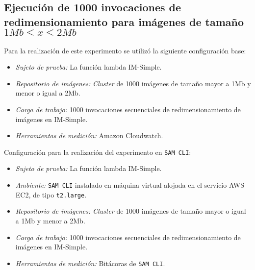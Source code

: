\subsection{Ejecución de 1000 invocaciones de redimensionamiento para imágenes de tamaño $1Mb \leq x \leq 2Mb$}

Para la realización de este experimento se utilizó la siguiente configuración base:
\begin{itemize}
    \item \emph{Sujeto de prueba:} La función lambda IM-Simple.
    \item \emph{Repositorio de imágenes:} \emph{Cluster} de 1000 imágenes de tamaño mayor a 1Mb y menor o igual a 2Mb.
    \item \emph{Carga de trabajo:} 1000 invocaciones secuenciales de redimensionamiento de imágenes en IM-Simple.
    \item \emph{Herramientas de medición:} Amazon Cloudwatch.
\end{itemize}

Configuración para la realización del experimento en \texttt{SAM CLI}:
\begin{itemize}
    \item \emph{Sujeto de prueba:} La función lambda IM-Simple.
    \item \emph{Ambiente:} \texttt{SAM CLI} instalado en máquina virtual alojada en el servicio AWS EC2, de tipo \texttt{t2.large}.
    \item \emph{Repositorio de imágenes:} \emph{Cluster} de 1000 imágenes de tamaño mayor o igual a 1Mb y menor a 2Mb.
    \item \emph{Carga de trabajo:} 1000 invocaciones secuenciales de redimensionamiento de imágenes en IM-Simple.
    \item \emph{Herramientas de medición:} Bitácoras de \texttt{SAM CLI}.
\end{itemize}

